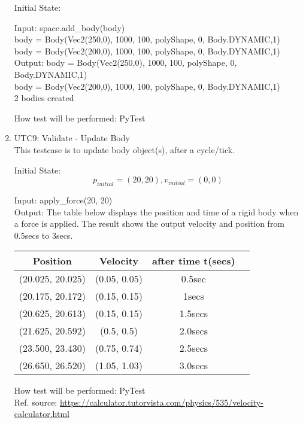 \documentclass[12pt, titlepage]{article}
\begin{document}
\begin{enumerate}
Initial State: 

Input: space.add\_body(body)\\
body = Body(Vec2(250,0), 1000, 100, polyShape, 0, Body.DYNAMIC,1)\\
body = Body(Vec2(200,0), 1000, 100, polyShape, 0, Body.DYNAMIC,1)\\

Output: body = Body(Vec2(250,0), 1000, 100, polyShape, 0, Body.DYNAMIC,1)\\
        body = Body(Vec2(200,0), 1000, 100, polyShape, 0, Body.DYNAMIC,1)\\
        2 bodies created

How test will be performed: PyTest\\

\item{UTC9}{: Validate - Update Body\\}
This testcase is to update body object(s), after a cycle/tick.

Initial State: \[p_{initial} = (20,20), v_{initial} = (0, 0)\]
            
Input: apply\_force(20, 20)\\
Output: The table below displays the position and time of a rigid body when a force is applied. The result shows the output velocity and position from 0.5secs to 3secs.
\begin{table} [h!]
	
	\centering
	
	\begin{tabular}{|c|c|c|c}
		
		\hline	
		
	\textbf{Position} &\textbf{Velocity} & \textbf{after time t(secs)}\\
	\hline 

	\hline(20.025, 20.025)& (0.05, 0.05)& 0.5sec \\ \hline
		
    (20.175, 20.172)& (0.15, 0.15)& 1secs \\ \hline
		
	(20.625, 20.613)& (0.15, 0.15)& 1.5secs \\ \hline
		
    (21.625, 20.592)& (0.5, 0.5)& 2.0secs \\ \hline
		
	(23.500, 23.430)& (0.75, 0.74)& 2.5secs \\ \hline
	
	(26.650, 26.520)& (1.05, 1.03)& 3.0secs \\ \hline
		
	\end{tabular}
	
	
\end{table}
How test will be performed: PyTest\\

Ref. source: \url{https://calculator.tutorvista.com/physics/535/velocity-calculator.html}


\end{enumerate}
\end{document}
